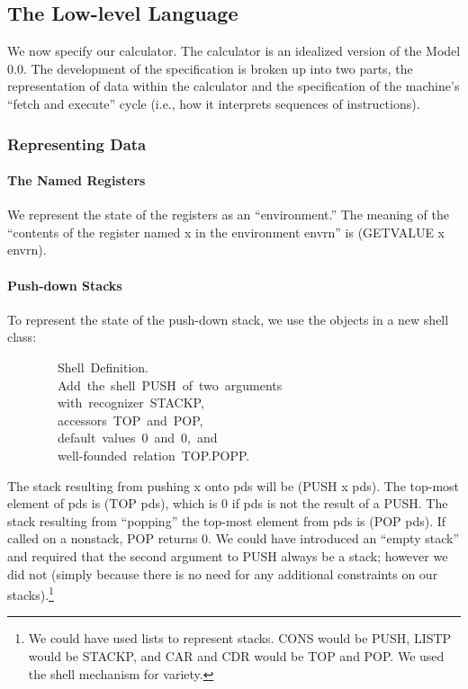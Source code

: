 \documentclass[11pt]{book}
\newenvironment{pubasis}{\begin{flushleft}\ttfamily\small}{\normalsize\rmfamily\end{flushleft}}
\newcommand{\pubdefaulttextsize}{\large}
\begin{document}
\subsection{The Low-level Language}
\pubdefaulttextsize
We now specify our calculator.  The calculator is an
idealized version of the Model 0.0.
The development of the specification
is broken up into two parts, the representation of data within the
calculator
and the specification of the machine's ``fetch and execute'' cycle (i.e.,
how it interprets sequences of instructions).
\subsubsection{Representing Data}
\pubdefaulttextsize
\paragraph{The Named Registers}
\pubdefaulttextsize
We represent the state of the registers as an ``environment.''
The meaning of the ``contents of the
register named x in the environment envrn'' is  (GETVALUE x envrn).
\paragraph{Push-down Stacks}
\pubdefaulttextsize
To represent the state of the push-down stack, we use the objects
in a new shell class:
\begin{pubasis}
~~~~~~~~Shell~Definition.\\
~~~~~~~~Add~the~shell~PUSH~of~two~arguments\\
~~~~~~~~with~recognizer~STACKP,\\
~~~~~~~~accessors~TOP~and~POP,\\
~~~~~~~~default~values~0~and~0,~and\\
~~~~~~~~well-founded~relation~TOP.POPP.\\
\end{pubasis}
The stack resulting from pushing x onto pds will be
(PUSH x pds).  The top-most element of pds is (TOP pds),
which is 0 if pds is not the result of a PUSH.  The stack resulting
from ``popping'' the top-most element from pds is (POP pds).  If
called on a nonstack, POP returns 0.  We could have introduced an
``empty stack'' and required that the second argument to PUSH always be
a stack; however we did not (simply because there is no need for any
additional constraints on our stacks).\footnote{We could have used lists to represent stacks.  CONS would be PUSH, LISTP would be STACKP, and CAR and CDR would be TOP and POP.  We used the shell mechanism for variety.}
\end{document}
